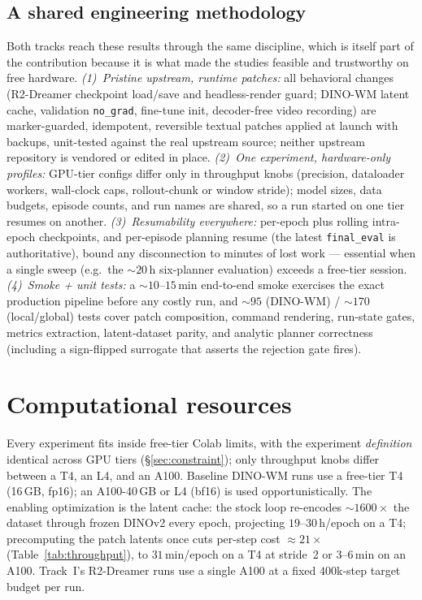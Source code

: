 \documentclass[11pt,a4paper]{article}
\begin{document}
\subsection{A shared engineering methodology}
\label{sec:method-shared}

Both tracks reach these results through the same discipline, which is itself
part of the contribution because it is what made the studies feasible and
trustworthy on free hardware. \emph{(1)~Pristine upstream, runtime patches:} all
behavioral changes (R2-Dreamer checkpoint load/save and headless-render guard;
DINO-WM latent cache, validation \texttt{no\_grad}, fine-tune init, decoder-free
video recording) are marker-guarded, idempotent, reversible textual patches
applied at launch with backups, unit-tested against the real upstream source;
neither upstream repository is vendored or edited in place. \emph{(2)~One
experiment, hardware-only profiles:} GPU-tier configs differ only in throughput
knobs (precision, dataloader workers, wall-clock caps, rollout-chunk or window
stride); model sizes, data budgets, episode counts, and run names are shared, so
a run started on one tier resumes on another. \emph{(3)~Resumability everywhere:}
per-epoch plus rolling intra-epoch checkpoints, and per-episode planning resume
(the latest \texttt{final\_eval} is authoritative), bound any disconnection to
minutes of lost work --- essential when a single sweep (e.g.\ the ${\sim}20$\,h
six-planner evaluation) exceeds a free-tier session. \emph{(4)~Smoke + unit
tests:} a ${\sim}10$--$15$\,min end-to-end smoke exercises the exact production
pipeline before any costly run, and ${\sim}95$ (DINO-WM) / ${\sim}170$
(local/global) tests cover patch composition, command rendering, run-state
gates, metrics extraction, latent-dataset parity, and analytic planner
correctness (including a sign-flipped surrogate that asserts the rejection gate
fires).

\section{Computational resources}
\label{sec:resources}

Every experiment fits inside free-tier Colab limits, with the experiment
\emph{definition} identical across GPU tiers (\S\ref{sec:constraint}); only
throughput knobs differ between a T4, an L4, and an A100. Baseline DINO-WM runs
use a free-tier T4 (16\,GB, fp16); an A100-40\,GB or L4 (bf16) is used
opportunistically. The enabling optimization is the latent cache: the stock loop
re-encodes ${\sim}1600\times$ the dataset through frozen DINOv2 every epoch,
projecting $19$--$30$\,h/epoch on a T4; precomputing the patch latents once cuts
per-step cost ${\approx}21\times$ (Table~\ref{tab:throughput}), to $31$\,min/epoch
on a T4 at stride~2 or $3$--$6$\,min on an A100. Track~I's R2-Dreamer runs use a
single A100 at a fixed $400$k-step target budget per run.
\end{document}
